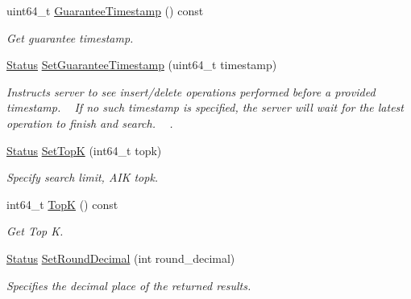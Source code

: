 \begin{DoxyCompactItemize}
uint64\+\_\+t \hyperlink{classmilvus_1_1_search_arguments_ab07eb3b4968436f36f0b3ec620dcdc11}{Guarantee\+Timestamp} () const
\begin{DoxyCompactList}\small\item\em Get guarantee timestamp. \end{DoxyCompactList}\item 
\hyperlink{classmilvus_1_1_status}{Status} \hyperlink{classmilvus_1_1_search_arguments_ac2e9e3e820db51c764c816b14b6e717f}{Set\+Guarantee\+Timestamp} (uint64\+\_\+t timestamp)
\begin{DoxyCompactList}\small\item\em Instructs server to see insert/delete operations performed before a provided timestamp. ~\newline
If no such timestamp is specified, the server will wait for the latest operation to finish and search. ~\newline
. \end{DoxyCompactList}\item 
\mbox{\label{classmilvus_1_1_search_arguments_a3ad3e29cfd3726628cbd77203e7af277}} 
\hyperlink{classmilvus_1_1_status}{Status} \hyperlink{classmilvus_1_1_search_arguments_a3ad3e29cfd3726628cbd77203e7af277}{Set\+TopK} (int64\+\_\+t topk)
\begin{DoxyCompactList}\small\item\em Specify search limit, A\+IK topk. \end{DoxyCompactList}\item 
\mbox{\label{classmilvus_1_1_search_arguments_acf264bf78982b48aff4dbb040e520fad}} 
int64\+\_\+t \hyperlink{classmilvus_1_1_search_arguments_acf264bf78982b48aff4dbb040e520fad}{TopK} () const
\begin{DoxyCompactList}\small\item\em Get Top K. \end{DoxyCompactList}\item 
\mbox{\label{classmilvus_1_1_search_arguments_a4296b7588545b044aafc7e6d05ffd96d}} 
\hyperlink{classmilvus_1_1_status}{Status} \hyperlink{classmilvus_1_1_search_arguments_a4296b7588545b044aafc7e6d05ffd96d}{Set\+Round\+Decimal} (int round\+\_\+decimal)
\begin{DoxyCompactList}\small\item\em Specifies the decimal place of the returned results. \end{DoxyCompactList}\item 

\end{DoxyCompactItemize}
